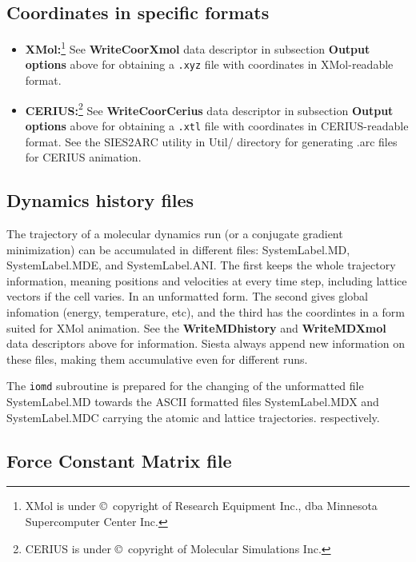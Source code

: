 \documentclass[11pt]{article}
\begin{document}
\subsection{Coordinates in specific formats}

\begin{itemize}
\item{\bf XMol:}\footnote[1]{XMol is under \copyright\ copyright of Research 
Equipment Inc., dba Minnesota Supercomputer Center Inc.}
See {\bf WriteCoorXmol} data descriptor in subsection {\bf Output options}
above for obtaining a {\tt .xyz} file with coordinates in 
XMol-readable format.

\item{\bf CERIUS:}\footnote[2]{CERIUS is under \copyright\ copyright of 
Molecular Simulations Inc.}
See {\bf WriteCoorCerius} data descriptor in subsection {\bf Output options}
above for obtaining a {\tt .xtl} file with coordinates in 
CERIUS-readable format. See the SIES2ARC
utility in Util/ directory
for generating .arc files for CERIUS animation.

\end{itemize}


\subsection{Dynamics history files}
The trajectory of a molecular dynamics run (or a conjugate gradient
minimization) can be accumulated in different files: SystemLabel.MD,
SystemLabel.MDE, and SystemLabel.ANI. The first keeps the whole trajectory
information, meaning positions and velocities at every time step, 
including lattice vectors if the cell varies. In an unformatted form.
The second gives global infomation (energy, temperature, etc),
and the third has the coordintes in a form suited for XMol animation.
See the {\bf WriteMDhistory} and {\bf WriteMDXmol} data descriptors 
above for information. {\sc Siesta} always append new information on these
files, making them accumulative even for different runs.

The {\tt iomd} subroutine is prepared for the changing of the 
unformatted file SystemLabel.MD towards the ASCII formatted files
SystemLabel.MDX and SystemLabel.MDC carrying the atomic and lattice
trajectories. respectively.

\subsection{Force Constant Matrix file}
\end{document}
